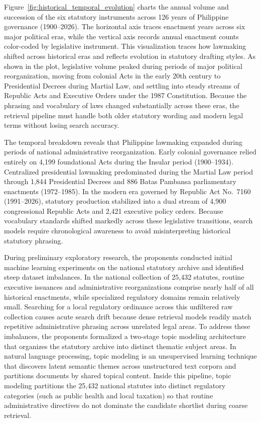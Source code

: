         Figure~\ref{fig:historical_temporal_evolution} charts the annual volume and succession of the six statutory instruments across 126 years of Philippine governance (1900--2026). The horizontal axis traces enactment years across six major political eras, while the vertical axis records annual enactment counts color-coded by legislative instrument. This visualization traces how lawmaking shifted across historical eras and reflects evolution in statutory drafting styles. As shown in the plot, legislative volume peaked during periods of major political reorganization, moving from colonial Acts in the early 20th century to Presidential Decrees during Martial Law, and settling into steady streams of Republic Acts and Executive Orders under the 1987 Constitution. Because the phrasing and vocabulary of laws changed substantially across these eras, the retrieval pipeline must handle both older statutory wording and modern legal terms without losing search accuracy.

        The temporal breakdown reveals that Philippine lawmaking expanded during periods of national administrative reorganization. Early colonial governance relied entirely on 4,199 foundational Acts during the Insular period (1900--1934). Centralized presidential lawmaking predominated during the Martial Law period through 1,844 Presidential Decrees and 886 Batas Pambansa parliamentary enactments (1972--1985). In the modern era governed by Republic Act No.~7160 (1991--2026), statutory production stabilized into a dual stream of 4,900 congressional Republic Acts and 2,421 executive policy orders. Because vocabulary standards shifted markedly across these legislative transitions, search models require chronological awareness to avoid misinterpreting historical statutory phrasing.

        During preliminary exploratory research, the proponents conducted initial machine learning experiments on the national statutory archive and identified steep dataset imbalances. In the national collection of 25,432 statutes, routine executive issuances and administrative reorganizations comprise nearly half of all historical enactments, while specialized regulatory domains remain relatively small. Searching for a local regulatory ordinance across this unfiltered raw collection causes acute search drift because dense retrieval models readily match repetitive administrative phrasing across unrelated legal areas. To address these imbalances, the proponents formalized a two-stage topic modeling architecture that organizes the statutory archive into distinct thematic subject areas. In natural language processing, topic modeling is an unsupervised learning technique that discovers latent semantic themes across unstructured text corpora and partitions documents by shared topical content. Inside this pipeline, topic modeling partitions the 25,432 national statutes into distinct regulatory categories (such as public health and local taxation) so that routine administrative directives do not dominate the candidate shortlist during coarse retrieval.

